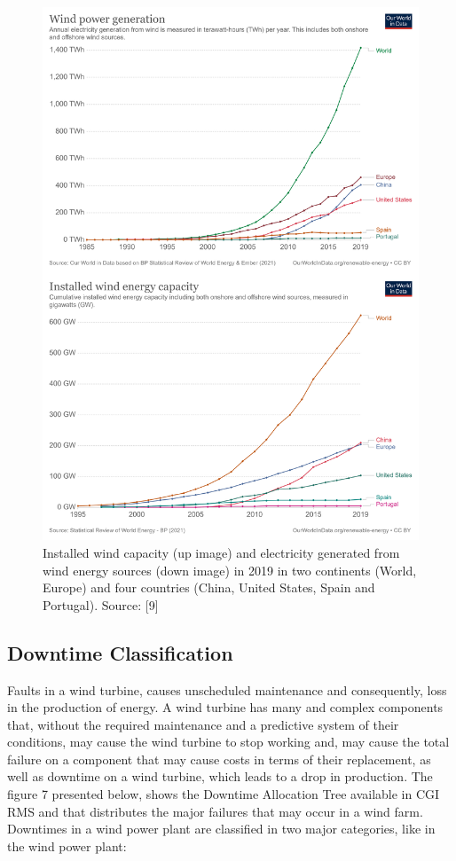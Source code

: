\begin{figure}[htbp]
	\centering
	\includegraphics[width=\textwidth]{Chapters/Figures/background_fig6.PNG}
	\caption{Installed wind capacity (up image) and electricity generated from wind energy sources (down image) in 2019 in two continents (World, Europe) and four countries (China, United States, Spain and Portugal). Source: [9]}
	\label{fig:Figuras_Tree_silhouettes-vectorial}
\end{figure}


\subsection{Downtime Classification} 
\label{sub:if_you_use_this_template} 

Faults in a wind turbine, causes unscheduled maintenance and consequently, loss in the production of energy. A wind turbine has many and complex components that, without the required maintenance and a predictive system of their conditions, may cause the wind turbine to stop working and, may cause the total failure on a component that may cause costs in terms of their replacement, as well as downtime on a wind turbine, which leads to a drop in production.
The figure 7 presented below, shows the Downtime Allocation Tree available in CGI RMS and that distributes the major failures that may occur in a wind farm. Downtimes in a wind power plant are classified in two major categories, like in the wind power plant:

